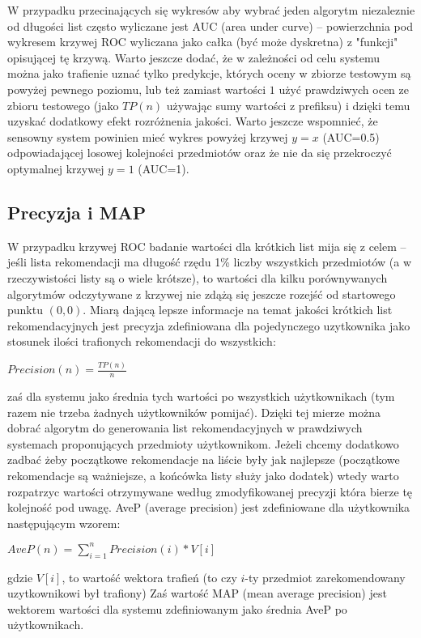 \documentclass{pracamgr}
\begin{document}
    W przypadku przecinających się wykresów aby wybrać jeden algorytm niezaleznie od długości list często wyliczane jest AUC (area under curve) --
    powierzchnia pod wykresem krzywej ROC wyliczana jako całka (być może dyskretna) z "funkcji" opisującej tę krzywą.
    Warto jeszcze dodać, że w zależności od celu systemu można jako trafienie uznać tylko predykcje, których oceny w zbiorze testowym są powyżej pewnego poziomu,
    lub też zamiast wartości $1$ użyć prawdziwych ocen ze zbioru testowego (jako $TP(n)$ używając sumy wartości z prefiksu)
    i dzięki temu uzyskać dodatkowy efekt rozróżnenia jakości.
    Warto jeszcze wspomnieć, że sensowny system powinien mieć wykres powyżej krzywej $y=x$ (AUC=0.5) odpowiadającej losowej kolejności przedmiotów
    oraz że nie da się przekroczyć optymalnej krzywej $y=1$ (AUC=1).
   \subsection{Precyzja i MAP}
    W przypadku krzywej ROC badanie wartości dla krótkich list mija się z celem -- jeśli lista rekomendacji ma długość rzędu 1\% liczby wszystkich przedmiotów
    (a w rzeczywistości listy są o wiele krótsze), to wartości dla kilku porównywanych algorytmów odczytywane
    z krzywej nie zdążą się jeszcze rozejść od startowego punktu $(0,0)$.\newline
    Miarą dającą lepsze informacje na temat jakości krótkich list rekomendacyjnych jest
    precyzja zdefiniowana dla pojedynczego uzytkownika jako stosunek ilości trafionych rekomendacji do wszystkich:
    \begin{center}
     $Precision(n)=\frac{TP(n)}{n}$
    \end{center}
    zaś dla systemu jako średnia tych wartości po wszystkich użytkownikach (tym razem nie trzeba żadnych użytkowników pomijać).\newline
    Dzięki tej mierze można dobrać algorytm do generowania list rekomendacyjnych w prawdziwych systemach proponujących przedmioty użytkownikom.
    Jeżeli chcemy dodatkowo zadbać żeby początkowe rekomendacje na liście były jak najlepsze
    (początkowe rekomendacje są ważniejsze, a końcówka listy służy jako dodatek) wtedy warto rozpatrzyc wartości otrzymywane według zmodyfikowanej precyzji
    która bierze tę kolejność pod uwagę.
    AveP (average precision) jest zdefiniowane dla użytkownika następującym wzorem:
    \begin{center}
     $AveP(n)=\sum\limits_{i=1}^{n}Precision(i)*V[i]$
    \end{center} 
    {\scriptsize
     gdzie $V[i]$, to wartość wektora trafień (to czy $i$-ty przedmiot zarekomendowany uzytkownikowi był trafiony)
    }\newline
    Zaś wartość MAP (mean average precision) jest wektorem wartości dla systemu zdefiniowanym jako średnia AveP po użytkownikach.
\end{document}
